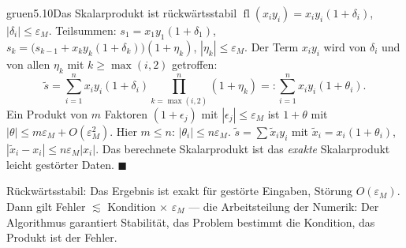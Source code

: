 \begin{loesungkarte}{gruen}{5.10}{Das Skalarprodukt ist rückwärtsstabil}
$\operatorname{fl}(x_iy_i) = x_iy_i(1 + \delta_i)$, $|\delta_i|\le\varepsilon_M$. Teilsummen: $s_1 = x_1y_1(1 + \delta_1)$, $s_k = \bigl(s_{k-1} + x_ky_k(1 + \delta_k)\bigr)(1 + \eta_k)$, $|\eta_k|\le\varepsilon_M$.
Der Term $x_iy_i$ wird von $\delta_i$ und von allen $\eta_k$ mit $k\ge\max(i, 2)$ getroffen:
\[ \tilde s = \sum_{i=1}^{n}x_iy_i(1 + \delta_i)\prod_{k=\max(i,2)}^{n}(1 + \eta_k) =: \sum_{i=1}^{n}x_iy_i(1 + \theta_i). \]
Ein Produkt von $m$ Faktoren $(1 + \epsilon_j)$ mit $|\epsilon_j|\le\varepsilon_M$ ist $1 + \theta$ mit $|\theta|\le m\varepsilon_M + O(\varepsilon_M^{2})$. Hier $m\le n$: $|\theta_i|\le n\varepsilon_M$.
$\tilde s = \sum\tilde x_iy_i$ mit $\tilde x_i = x_i(1 + \theta_i)$, $|\tilde x_i - x_i|\le n\varepsilon_M|x_i|$. Das berechnete Skalarprodukt ist das \emph{exakte} Skalarprodukt leicht gestörter Daten. $\blacksquare$
\begin{mitnehmen}\kastentext
Rückwärtsstabil: Das Ergebnis ist exakt für gestörte Eingaben, Störung $O(\varepsilon_M)$. Dann gilt Fehler $\lesssim$ Kondition $\times$ $\varepsilon_M$ --- die Arbeitsteilung der Numerik: Der Algorithmus garantiert Stabilität, das Problem bestimmt die Kondition, das Produkt ist der Fehler.
\end{mitnehmen}
\end{loesungkarte}

